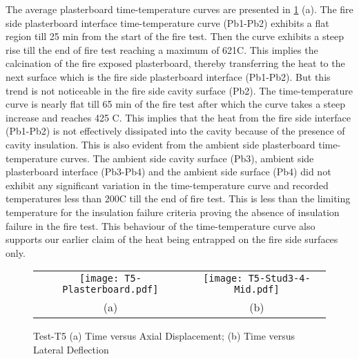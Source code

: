 The average plasterboard time-temperature curves are presented in \cref{fig:T5-time-temperature} (a). The fire side plasterboard interface time-temperature curve (Pb1-Pb2) exhibits a flat region till 25 min from the start of the fire test. Then the curve exhibits a steep rise till the end of fire test reaching a maximum of 621\degree C. This implies the calcination of the fire exposed plasterboard, thereby transferring the heat to the next surface which is the fire side plasterboard interface (Pb1-Pb2). But this trend is not noticeable in the fire side cavity surface (Pb2). The time-temperature curve is nearly flat till 65 min of the fire test after which the curve takes a steep increase and reaches 425 \degree C. This implies that the heat from the fire side interface (Pb1-Pb2) is not effectively dissipated into the cavity because of the presence of cavity insulation. This is also evident from the ambient side plasterboard time-temperature curves. The ambient side cavity surface (Pb3), ambient side plasterboard interface (Pb3-Pb4) and the ambient side surface (Pb4) did not exhibit any significant variation in the time-temperature curve and recorded temperatures less than 200\degree C till the end of fire test. This is less than the limiting temperature for the insulation failure criteria proving the absence of insulation failure in the fire test. This behaviour of the time-temperature curve also supports our earlier claim of the heat being entrapped on the fire side surfaces only.
\begin{figure}[!htbp]
	\centering	
		\begin{tabular}{cc}
			\texttt{[image: T5-Plasterboard.pdf]} & \texttt{[image: T5-Stud3-4-Mid.pdf]} \\
			(a) & (b) \\
			\end{tabular}
		\caption{Test-T5 (a) Time versus Axial Displacement; (b) Time versus Lateral Deflection}
		\label{fig:T5-time-temperature}
\end{figure}

